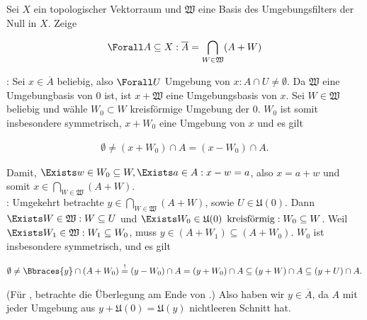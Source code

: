 \begin{exercise}

Sei $X$ ein topologischer Vektorraum und $\mathfrak{W}$ eine Basis des Umgebungsfilters der Null in $X$.
Zeige

\begin{align*}
  \Forall A \subseteq X:
  \overline{A}
  =
  \bigcap_{W \in \mathfrak{W}} (A + W)
\end{align*}

\end{exercise}

\begin{solution}

\Quote{$\subseteq$}:
Sei $x \in \overline{A}$ beliebig, also $\Forall U$ Umgebung von $x: A \cap U \neq \emptyset$.
Da $\mathfrak{W}$ eine Umgebungbasis von $0$ ist, ist $x + \mathfrak{W}$ eine Umgebungsbasis von $x$.
Sei $W \in \mathfrak{W}$ beliebig und wähle $W_0 \subset W$ kreisförmige Umgebung der $0$.
$W_0$ ist somit insbesondere symmetrisch, $x + W_0$ eine Umgebung von $x$ und es gilt

\begin{align*}
  \emptyset
  \neq
  (x + W_0) \cap A
  =
  (x - W_0) \cap A.
\end{align*}

Damit, $\Exists w \in W_0 \subseteq W, \Exists a \in A: x - w = a$, also $x = a + w$ und somit $x \in \bigcap_{W \in \mathfrak{W}}(A + W)$. \\

\Quote{$\supseteq$}:
Umgekehrt betrachte $y \in \bigcap_{W \in \mathfrak{W}}(A + W)$, sowie $ U \in \mathfrak{U}(0)$.
Dann $\Exists W \in \mathfrak{W}: W \subseteq U$ und $\Exists W_0 \in \mathfrak{U}(0) \enspace \text{kreisförmig}: W_0 \subseteq W$.
Weil $\Exists W_1 \in \mathfrak{W}: W_1 \subseteq W_0$, muss $y \in (A + W_1) \subseteq (A + W_0)$.
$W_0$ ist insbesondere symmetrisch, und es gilt

\begin{align*}
  \emptyset
  \neq
  \Bbraces{y} \cap (A + W_0)
  \stackrel{!}{=}
  (y - W_0) \cap A = (y + W_0) \cap A
  \subseteq
  (y + W) \cap A
  \subseteq
  (y + U) \cap A.
\end{align*}

(Für \Quote{!}, betrachte die Überlegung am Ende von \Quote{$\subseteq$}.)
Also haben wir $y \in \overline{A}$, da $A$ mit jeder Umgebung aus $y + \mathfrak{U}(0) = \mathfrak{U}(y)$ nichtleeren Schnitt hat.

\end{solution}

